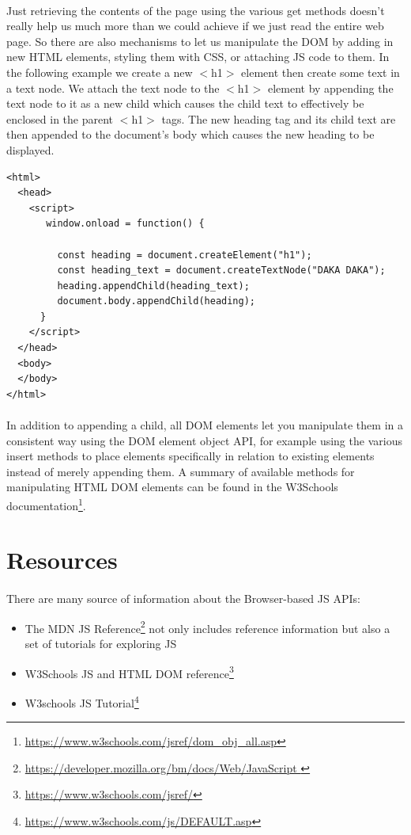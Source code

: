 \paragraph{} Just retrieving the contents of the page using the various get methods doesn't really help us much more than we could achieve if we just read the entire web page. So there are also mechanisms to let us manipulate the DOM by adding in new HTML elements, styling them with CSS, or attaching JS code to them. In the following example we create a new $<$h1$>$ element then create some text in a text node. We attach the text node to the $<$h1$>$ element by appending the text  node to it as a new child which causes the child text to effectively be enclosed in the parent $<$h1$>$ tags. The new heading tag and its child text are then appended to the document's body which causes the new heading to be displayed.

\begin{lstlisting}
<html>
  <head>
    <script>
       window.onload = function() {

         const heading = document.createElement("h1");
         const heading_text = document.createTextNode("DAKA DAKA");
         heading.appendChild(heading_text);
         document.body.appendChild(heading);
      }
    </script>
  </head>
  <body>
  </body>
</html>
\end{lstlisting}

\paragraph{} In addition to appending a child, all DOM elements let you manipulate them in a consistent way using the DOM element object API, for example using the various insert methods to place elements specifically in relation to existing elements instead of merely appending them. A summary of available methods for manipulating HTML DOM elements can be found in the W3Schools documentation\footnote{\url{https://www.w3schools.com/jsref/dom_obj_all.asp}}.

	

\section{Resources}
\paragraph{} There are many source of information about the Browser-based JS APIs: 
\begin{itemize}
\item The MDN JS Reference\footnote{\url{https://developer.mozilla.org/bm/docs/Web/JavaScript
}} not only includes reference information but also a set of tutorials for exploring JS
\item W3Schools JS and HTML DOM reference\footnote{\url{https://www.w3schools.com/jsref/}}
\item W3schools JS Tutorial\footnote{\url{https://www.w3schools.com/js/DEFAULT.asp}}
\end{itemize}


